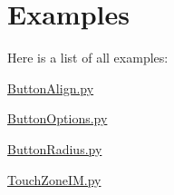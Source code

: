\section{Examples}
Here is a list of all examples\-:\begin{DoxyCompactItemize}
\item 
\hyperlink{_button_align_8py-example}{Button\-Align.\-py}
\item 
\hyperlink{_button_options_8py-example}{Button\-Options.\-py}
\item 
\hyperlink{_button_radius_8py-example}{Button\-Radius.\-py}
\item 
\hyperlink{_touch_zone_i_m_8py-example}{Touch\-Zone\-I\-M.\-py}
\end{DoxyCompactItemize}
